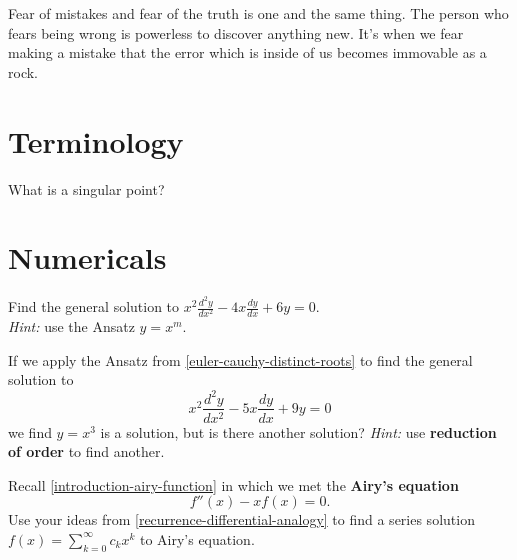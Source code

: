 \documentclass{homework}
\author{Jim Fowler}
\begin{document}
\maketitle

\begin{inspiration}
Fear of mistakes and fear of the truth is one and the same thing. The person who fears being wrong is powerless to discover anything new. It's when we fear making a mistake that the error which is inside of us becomes immovable as a rock.
\end{inspiration}

\section{Terminology}

\begin{problem}\label{defn-singular-point}What is a singular point?
\end{problem}

\section{Numericals}

\begin{problem}\label{euler-cauchy-distinct-roots}Find the general solution to \(x^{2}{\displaystyle\frac  {d^{2}y}{dx^{2}}}-4x{\displaystyle\frac  {dy}{dx}}+6y=0\).\\
  \textit{Hint:} use the Ansatz $y = x^m$.
\end{problem}

\begin{problem}\label{euler-cauchy-single-root}If we apply the Ansatz from
  \ref{euler-cauchy-distinct-roots} to find the general solution to
  \[ 
    x^{2}{\frac  {d^{2}y}{dx^{2}}}-5x{\frac  {dy}{dx}}+9y=0
  \]
  we find $y = x^3$ is a solution, but is there another solution?  \textit{Hint:} use  \textbf{reduction of order} to find another.
\end{problem}

\begin{problem}Recall \ref{introduction-airy-function} in which we met the \textbf{Airy's equation}
  \[
    f''(x) - x f(x) = 0.
  \]
  Use your ideas from \ref{recurrence-differential-analogy} to find a series solution $f(x) = \sum_{k=0}^\infty c_k x^k$ to Airy's equation.
\end{problem}
\end{document}
